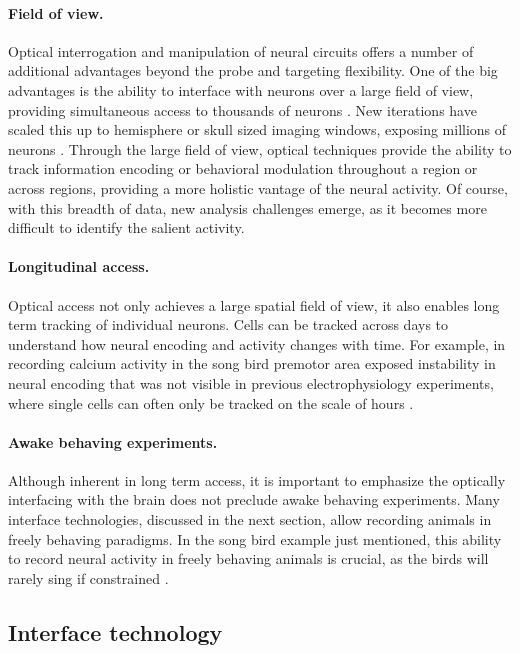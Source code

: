 \paragraph{Field of view.} Optical interrogation and manipulation 
of neural circuits offers a number of additional advantages 
beyond the probe and targeting flexibility. One of the big 
advantages is the ability to interface with neurons over a 
large field of view, providing simultaneous access to thousands 
of neurons \cite{Mohammed:2016fq}. New iterations have scaled 
this up to hemisphere or skull sized imaging windows, exposing 
millions of neurons \cite{Kim:2016hh}. Through the large field 
of view, optical techniques provide the ability to track 
information encoding or behavioral modulation throughout a 
region or across regions, providing a more holistic vantage of
the neural activity. Of course, with this breadth of data, new 
analysis challenges emerge, as it becomes more difficult to 
identify the salient activity.

\paragraph{Longitudinal access.} Optical access not only 
achieves a large spatial field of view, it also enables long
term tracking of individual neurons. Cells can be tracked 
across days to understand how neural encoding and activity 
changes with time. For example, in recording calcium activity 
in the song bird premotor area exposed instability in 
neural encoding \cite{Liberti:2016bc} that was not visible in 
previous electrophysiology experiments, where single cells 
can often only be tracked on the scale of hours 
\cite{Hahnloser:2002hj}.

\paragraph{Awake behaving experiments.} Although inherent in 
long term access, it is important to emphasize the optically 
interfacing with the brain does not preclude awake behaving 
experiments. Many interface technologies, discussed in the 
next section, allow recording animals in freely behaving 
paradigms. In the song bird example just mentioned, this 
ability to record neural activity in freely behaving animals 
is crucial, as the birds will rarely sing if constrained 
\cite{LibertiIII:2017df}.

\subsection{Interface technology}

